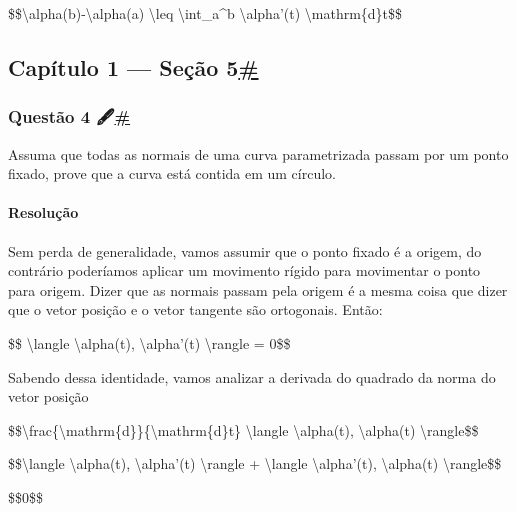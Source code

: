 \$\$\textbar{}\textbackslash{}alpha(b)-\textbackslash{}alpha(a)\textbar{}
\textbackslash{}leq \textbackslash{}int\_a\^{}b \textbar{}
\textbackslash{}alpha'(t)\textbar{} \textbackslash{}mathrm\{d\}t\$\$

\hypertarget{capuxedtulo-1--seuxe7uxe3o-5}{%
\subsection{\texorpdfstring{Capítulo 1 --- Seção
5\protect\hyperlink{capuxedtulo-1--seuxe7uxe3o-5}{\#}}{Capítulo 1 --- Seção 5\#}}\label{capuxedtulo-1--seuxe7uxe3o-5}}

\hypertarget{questuxe3o-4-}{%
\subsubsection{\texorpdfstring{Questão 4
🖋️\protect\hyperlink{questuxe3o-4-}{\#}}{Questão 4 🖋️\#}}\label{questuxe3o-4-}}

Assuma que todas as normais de uma curva parametrizada passam por um
ponto fixado, prove que a curva está contida em um círculo.

\hypertarget{resoluuxe7uxe3o-4}{%
\paragraph{Resolução}\label{resoluuxe7uxe3o-4}}

Sem perda de generalidade, vamos assumir que o ponto fixado é a origem,
do contrário poderíamos aplicar um movimento rígido para movimentar o
ponto para origem. Dizer que as normais passam pela origem é a mesma
coisa que dizer que o vetor posição e o vetor tangente são ortogonais.
Então:

\$\$ \textbackslash{}langle \textbackslash{}alpha(t),
\textbackslash{}alpha'(t) \textbackslash{}rangle = 0\$\$

Sabendo dessa identidade, vamos analizar a derivada do quadrado da norma
do vetor posição

\$\$\textbackslash{}frac\{\textbackslash{}mathrm\{d\}\}\{\textbackslash{}mathrm\{d\}t\}
\textbackslash{}langle \textbackslash{}alpha(t),
\textbackslash{}alpha(t) \textbackslash{}rangle\$\$

\$\$\textbackslash{}langle \textbackslash{}alpha(t),
\textbackslash{}alpha'(t) \textbackslash{}rangle +
\textbackslash{}langle \textbackslash{}alpha'(t),
\textbackslash{}alpha(t) \textbackslash{}rangle\$\$

\$\$0\$\$

